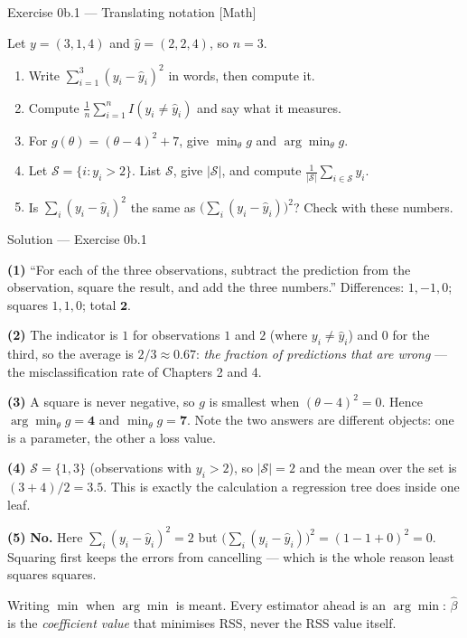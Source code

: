 \documentclass[aspectratio=169,11pt]{beamer}
\begin{document}
\begin{frame}{Exercise 0b.1 --- Translating notation [Math]}
  \begin{exercise}
    Let $y = (3, 1, 4)$ and $\hat y = (2, 2, 4)$, so $n = 3$.
    \begin{enumerate}
      \item Write $\sum_{i=1}^{3}(y_i - \hat y_i)^2$ in words, then compute it.
      \item Compute $\frac{1}{n}\sum_{i=1}^{n} I(y_i \ne \hat y_i)$ and say what
            it measures.
      \item For $g(\theta) = (\theta - 4)^2 + 7$, give $\min_\theta g$ and
            $\arg\min_\theta g$.
      \item Let $\mathcal{S} = \{i : y_i > 2\}$. List $\mathcal{S}$, give
            $|\mathcal{S}|$, and compute $\frac{1}{|\mathcal{S}|}\sum_{i \in \mathcal{S}} y_i$.
      \item Is $\sum_i (y_i - \hat y_i)^2$ the same as
            $\bigl(\sum_i (y_i - \hat y_i)\bigr)^2$? Check with these numbers.
    \end{enumerate}
  \end{exercise}
\end{frame}

\begin{frame}{Solution --- Exercise 0b.1}
  \begin{solutionbox}
    \textbf{(1)} ``For each of the three observations, subtract the prediction
    from the observation, square the result, and add the three numbers.''
    Differences: $1, -1, 0$; squares $1, 1, 0$; total $\mathbf{2}$.

    \textbf{(2)} The indicator is $1$ for observations $1$ and $2$ (where
    $y_i \neq \hat y_i$) and $0$ for the third, so the average is
    $2/3 \approx 0.67$: \emph{the fraction of predictions that are wrong} ---
    the misclassification rate of Chapters 2 and 4.

    \textbf{(3)} A square is never negative, so $g$ is smallest when
    $(\theta-4)^2 = 0$. Hence $\arg\min_\theta g = \mathbf{4}$ and
    $\min_\theta g = \mathbf{7}$. Note the two answers are different objects:
    one is a parameter, the other a loss value.

    \textbf{(4)} $\mathcal{S} = \{1, 3\}$ (observations with $y_i > 2$), so
    $|\mathcal{S}| = 2$ and the mean over the set is $(3+4)/2 = \mathbf{3.5}$.
    This is exactly the calculation a regression tree does inside one leaf.

    \textbf{(5)} \textbf{No.} Here $\sum_i (y_i - \hat y_i)^2 = 2$ but
    $\bigl(\sum_i (y_i - \hat y_i)\bigr)^2 = (1 - 1 + 0)^2 = 0$. Squaring
    first keeps the errors from cancelling --- which is the whole reason
    least squares squares.
  \end{solutionbox}
  \begin{mistake}
    Writing $\min$ when $\arg\min$ is meant.
    Every estimator ahead is an $\arg\min$: $\hat\beta$ is the
    \emph{coefficient value} that minimises RSS, never the RSS value itself.
  \end{mistake}
\end{frame}
\end{document}
